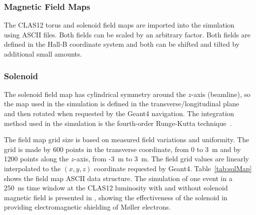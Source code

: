 \subsubsection{Magnetic Field Maps}
\label{sec:clas12FieldMaps}

The CLAS12 torus and solenoid field maps are imported into the simulation using ASCII files. Both fields can be scaled
by an arbitrary factor. Both fields are defined in the Hall-B coordinate system and both can be shifted and tilted by
additional small amounts.

\subsubsection{Solenoid}

The solenoid field map has cylindrical symmetry around the $z$-axis (beamline), so the map used in the simulation is
defined in the transverse/longitudinal plane and then rotated when requested by the Geant4 navigation. The integration
method used in the simulation is the fourth-order Runge-Kutta technique~\cite{rungeKutta}.

The field map grid size is based on measured field variations and uniformity. The grid is made by 600 points in the
transverse coordinate, from 0 to 3~m and by 1200 points along the $z$-axis, from -3~m to 3~m. The field grid values
are linearly interpolated to the $(x,y,z)$ coordinate requested by Geant4. Table~\ref{tab:solMap} shows the field map
ASCII data structure. The simulation of one event in a 250~ns time window at the CLAS12 luminosity with and without
solenoid magnetic field is presented in , showing the effectiveness of the solenoid in providing
electromagnetic shielding of M\o ller electrons.

